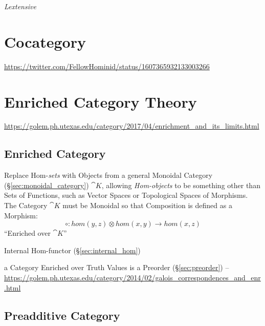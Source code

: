 \emph{Lextensive}



\section{Cocategory}\label{sec:cocategory}

\url{https://twitter.com/FellowHominid/status/1607365932133003266}



\section{Enriched Category Theory}\label{sec:enriched_category_theory}

\url{https://golem.ph.utexas.edu/category/2017/04/enrichment_and_its_limits.html}



\subsection{Enriched Category}\label{sec:enriched_category}

Replace Hom-\emph{sets} with Objects from a general Monoidal Category
(\S\ref{sec:monoidal_category}) $\cat{K}$, allowing \emph{Hom-objects} to be
something other than Sets of Functions, such as Vector Spaces or Topological
Spaces of Morphisms. The Category $\cat{K}$ must be Monoidal so that Composition
is defined as a Morphism:
\[
  \circ : hom(y,z) \otimes hom(x,y) \rightarrow hom(x,z)
\]
``Enriched over $\cat{K}$''

Internal Hom-functor (\S\ref{sec:internal_hom})

a Category Enriched over Truth Values is a Preorder (\S\ref{sec:preorder}) --
\url{https://golem.ph.utexas.edu/category/2014/02/galois_correspondences_and_enr.html}



\subsection{Preadditive Category}\label{sec:preadditive_category}

